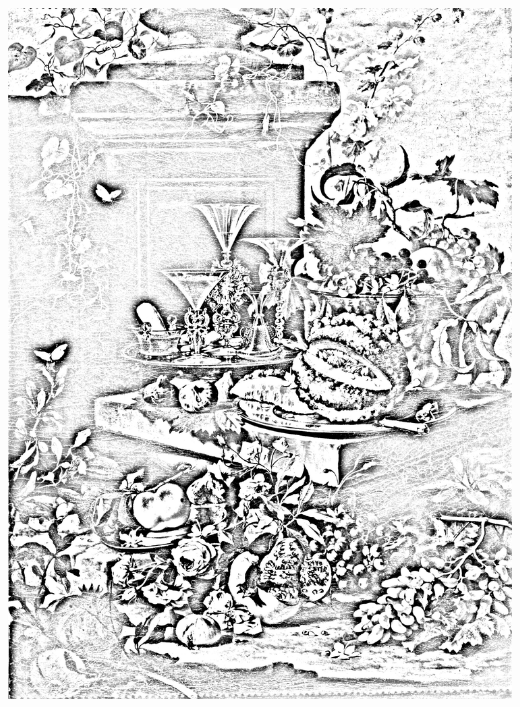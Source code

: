 \documentclass[hidelinks,12pt,a4paper]{article}
\begin{document}
\begin{adjustwidth}{-30mm}{-30mm}
			\thispagestyle{empty}
			\begin{minipage}{0.91\linewidth}
				\centering
				\includegraphics[scale=0.2]{Berentz_Christian-Fiori_e_frutta_con_bicchieri_di_cristallo.jpg}
			\end{minipage}
			
			\vspace*{\fill}
			\newpage
			

\end{adjustwidth}
\end{document}
